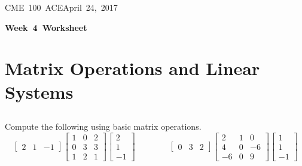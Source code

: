 \documentclass[letterpaper, 11pt]{article}
\makeatletter
\newcommand{\hmwkTitle}{Week\ 4\ Worksheet} %
\newcommand{\hmwkClass}{CME\ 100\ ACE} %
\newcommand{\hmwkAuthorName}{Timothy Anderson} %
\newcommand{\hmwkAuthorEmail}{timmya@stanford.edu} %
\makeatother
\begin{document}
\noindent
\normalsize 
\hmwkClass \hfill April\ 24,\ 2017\\

\begin{center} \Large \textbf{\hmwkTitle} \end{center}

\section{Matrix Operations and Linear Systems}
\subsection{} Compute the following using basic matrix operations.
\[
\left[\begin{array}{ccc} 2 & 1 &-1 \end{array} \right]  \left[ \begin{array}{ccc} 1 & 0 & 2 \\ 0 & 3 & 3 \\ 1 & 2 & 1 \end{array}   \right]\left[\begin{array}{c} 2\\ 1 \\-1 \end{array} \right] \qquad \qquad 
\left[\begin{array}{ccc} 0 & 3 & 2 \end{array} \right]  \left[ \begin{array}{ccc} 2 & 1 &0  \\ 4 & 0 & -6 \\ -6 & 0 & 9 \end{array}   \right] \left[\begin{array}{c} 1 \\ 1 \\ -1 \end{array} \right]  
\]
\end{document}
